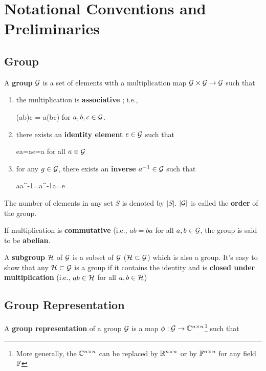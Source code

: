 \chapter{Notational Conventions and Preliminaries}
\label{ch-conventions}

\section{Group}

A {\bf group}
${\cal G}$
is a set of elements
with a multiplication map ${\cal G}\times {\cal G}
\rightarrow {\cal G}$
such that


\begin{enumerate}
\item 
the multiplication is {\bf associative
}; i.e., 

\beq
(ab)c = a(bc)
\eeq
for $a,b,c\in{\cal G}$.

\item
there exists an {\bf identity element}
$e\in {\cal G}$
such that 

\beq
ea=ae=a
\eeq
for all $a\in {\cal G}$

\item
for any $g\in{\cal G}$,
there exists an {\bf inverse} $a^{-1}\in {\cal G}$ such that

\beq
aa^{-1}=a^{-1}a=e
\eeq
\end{enumerate}

The number of elements in any set $S$ is denoted by $|S|$. 
$|{\cal G}|$
is called the {\bf order}
of the group.

If multiplication is
{\bf commutative}
(i.e., $ab=ba$ for all $a,b\in{\cal G}$,
the group is said to be {\bf abelian}.

A {\bf subgroup} ${\cal H}$ 
of ${\cal G}$
is a subset of ${\cal G}$
(${\cal H} \subset {\cal G}$)
which is also a group.
It's easy to show that any ${\cal H}\subset {\cal G}$ is a group if it
contains the identity
and is {\bf closed 
under multiplication} (i.e., $ab\in {\cal H}$ for all $a,b\in {\cal H}$) 



\section{Group  Representation}

A {\bf group representation}
of a group ${\cal G}$
is a map $\phi: {\cal G}\rightarrow { \mathbb{C}}^{n\times n}$\footnote{More generally, the ${ \mathbb{C}}^{n\times n}$ can be replaced by ${ \mathbb{R}}^{n\times n}$ or by ${ \mathbb{F}}^{n\times n}$ for any field ${ \mathbb{F}}$} such that

